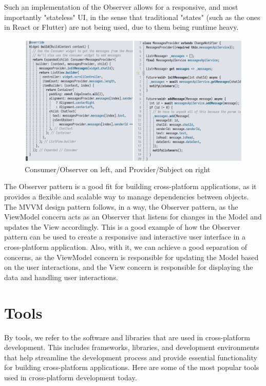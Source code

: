 Such an implementation of the Observer allows for a responsive, and most importantly "stateless" UI, 
in the sense that traditional "states" (such as the ones in React or Flutter) are not being used, due to them being runtime heavy.
\begin{figure}[htbp]
    \centering
    \includegraphics[scale=0.23]{pictures/subject_observer.png}
    \caption{Consumer/Observer on left, and Provider/Subject on right}
    \label{subjectObserverExample}
\end{figure}

\par
The Observer pattern is a good fit for building cross-platform applications, as it provides a flexible and scalable way to manage dependencies between objects.
The MVVM design pattern follows, in a way, the Observer pattern, as the ViewModel concern acts as an Observer that listens for changes in the Model and updates the View accordingly.
This is a good example of how the Observer pattern can be used to create a responsive and interactive user interface in a cross-platform application.
Also, with it, we can achieve a good separation of concerns, as the ViewModel concern is responsible for updating the Model based on the user interactions, 
and the View concern is responsible for displaying the data and handling user interactions.



\section{Tools}
By tools, we refer to the software and libraries that are used in cross-platform development.
This includes frameworks, libraries, and development environments that help streamline the development process and provide essential functionality for building cross-platform applications.
Here are some of the most popular tools used in cross-platform development today.

